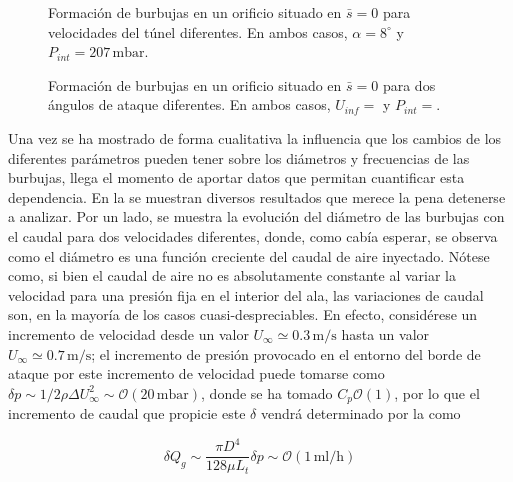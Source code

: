 \begin{figure}
\centering
{} \hspace{1mm}
\caption{Formación de burbujas en un orificio situado en $\bar{s} = 0$ para velocidades del túnel diferentes. En ambos casos, $\alpha = 8^{\circ}$ y $P_{int} = 207\,\mathrm{mbar}$.}
\end{figure}

\begin{figure}
\centering
{}
\caption{Formación de burbujas en un orificio situado en $\bar{s} = 0$ para dos ángulos de ataque diferentes. En ambos casos, $U_{inf} = $ y $P_{int} = $.}
\end{figure}


Una vez se ha mostrado de forma cualitativa la influencia que los cambios de los diferentes parámetros pueden tener sobre los diámetros y frecuencias de las burbujas, llega el momento de aportar datos que permitan cuantificar esta dependencia. En la  se muestran diversos resultados que merece la pena detenerse a analizar.  Por un lado, se muestra la evolución del diámetro de las burbujas con el caudal para dos velocidades diferentes, donde, como cabía esperar, se observa como el diámetro es una función creciente del caudal de aire inyectado. Nótese como, si bien el caudal de aire no es absolutamente  constante al variar la velocidad para una presión fija en el interior del ala, las variaciones de caudal son, en la mayoría de los casos cuasi-despreciables. En efecto, considérese un incremento de velocidad desde un valor $U_{\infty} \simeq 0.3\,\mathrm{m/s}$ hasta un valor $U_{\infty} \simeq 0.7\,\mathrm{m/s}$; el incremento de presión provocado en el entorno del borde de ataque por este incremento de velocidad puede tomarse como $\delta p \sim 1/2\rho \Delta U_{\infty}^{2} \sim \mathcal{O}\left(20\,\mathrm{mbar}\right)$,  donde se ha tomado $C_{p} \mathcal{O}\left(1\right)$, por lo que el incremento de caudal que propicie este $\delta$ vendrá determinado por la  como

\begin{displaymath}
\delta Q_{g} \sim \dfrac{\pi D^{4}}{128 \mu L_{t}}\delta p \sim \mathcal{O}\left(1\, \mathrm{ml/h}\right)
\end{displaymath}

